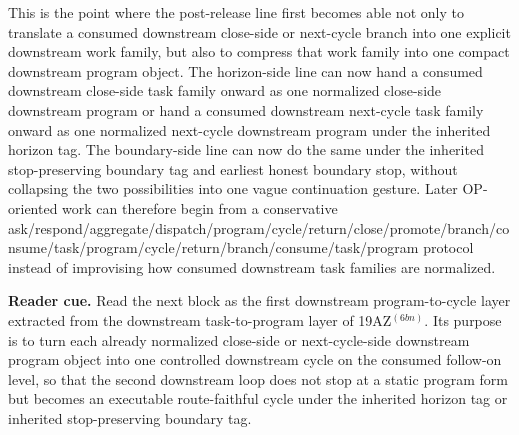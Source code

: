 \begin{remark}
\label{rem:what-the-first-downstream-task-to-program-layer-on-the-consumed-follow-on-level-now-buys}
This is the point where the post-release line first becomes able not only to translate a consumed downstream close-side or next-cycle branch into one explicit downstream work family, but also to compress that work family into one compact downstream program object. The horizon-side line can now hand a consumed downstream close-side task family onward as one normalized close-side downstream program or hand a consumed downstream next-cycle task family onward as one normalized next-cycle downstream program under the inherited horizon tag. The boundary-side line can now do the same under the inherited stop-preserving boundary tag and earliest honest boundary stop, without collapsing the two possibilities into one vague continuation gesture. Later OP-oriented work can therefore begin from a conservative ask/\allowbreak{}respond/\allowbreak{}aggregate/\allowbreak{}dispatch/\allowbreak{}program/\allowbreak{}cycle/\allowbreak{}return/\allowbreak{}close/\allowbreak{}promote/\allowbreak{}branch/\allowbreak{}consume/\allowbreak{}task/\allowbreak{}program/\allowbreak{}cycle/\allowbreak{}return/\allowbreak{}branch/\allowbreak{}consume/\allowbreak{}task/\allowbreak{}program protocol instead of improvising how consumed downstream task families are normalized.
\end{remark}


\noindent\textbf{Reader cue.} Read the next block as the first downstream program-to-cycle layer extracted from the downstream task-to-program layer of 19AZ$^{(6bn)}$. Its purpose is to turn each already normalized close-side or next-cycle-side downstream program object into one controlled downstream cycle on the consumed follow-on level, so that the second downstream loop does not stop at a static program form but becomes an executable route-faithful cycle under the inherited horizon tag or inherited stop-preserving boundary tag.

